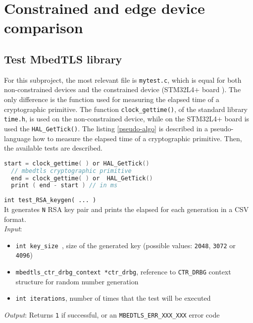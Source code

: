 
\section{Constrained and edge device comparison}
\subsection{Test MbedTLS library}
For this subproject, the most relevant file is \texttt{mytest.c}, which is equal for both non-constrained devices and the constrained device (STM32L4+ board \cite{stm32-board-product}). The only difference is the function used for measuring the elapsed time of a cryptographic primitive. The function \texttt{clock\_gettime()}, of the standard library \texttt{time.h}, is used on the non-constrained device, while on the STM32L4+ board is used the \texttt{HAL\_GetTick()}. The listing \ref{pseudo-algo} is described in a pseudo-language how to measure the elapsed time of a cryptographic primitive. 
Then, the available tests are described. \\

\begin{lstlisting}[caption={Pseudo algorithm for measuring the elapsed time},captionpos=b,label={pseudo-algo},language=C,frame=single]
  start = clock_gettime( ) or HAL_GetTick()
  // mbedtls cryptographic primitive
  end = clock_gettime( ) or  HAL_GetTick()
  print ( end - start ) // in ms
\end{lstlisting}

\noindent
\texttt{int test\_RSA\_keygen( ... )}\\
It generates \texttt{N} RSA key pair and prints the elapsed for each generation in a CSV format. \\
\textit{Input}:
\begin{itemize}[noitemsep,nolistsep]
  \item \texttt{int key\_size }, size of the generated key (possible values: \texttt{2048}, \texttt{3072} or \texttt{4096})
  \item \texttt{mbedtls\_ctr\_drbg\_context *ctr\_drbg}, reference to \texttt{CTR\_DRBG} context structure for random number generation
  \item \texttt{int iterations}, number of times that the test will be executed
\end{itemize}
\textit{Output}: Returns \texttt{1} if successful, or an \texttt{MBEDTLS\_ERR\_XXX\_XXX} error code


